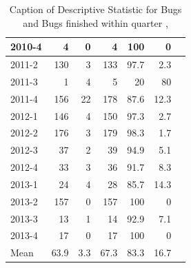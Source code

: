 \documentclass[UKenglish]{ifimaster}  %
\begin{document}
\begin{appendices}
\begin{table}[!htbp]
\begin{adjustwidth}{-2.5cm}{}
{{\begin{tabular}{ | l | r | r | r | r | r | r | }
2010-4 & 4 & 0 & 4 & 100 & 0 \\ \hline
2011-2 & 130 & 3 & 133 & 97.7 & 2.3 \\ \hline
2011-3 & 1 & 4 & 5 & 20 & 80 \\ \hline
2011-4 & 156 & 22 & 178 & 87.6 & 12.3 \\ \hline
2012-1 & 146 & 4 & 150 & 97.3 & 2.7 \\ \hline
2012-2 & 176 & 3 & 179 & 98.3& 1.7 \\ \hline
2012-3 & 37 & 2 & 39 & 94.9& 5.1\\ \hline
2012-4 & 33 & 3 & 36 & 91.7 & 8.3 \\ \hline
2013-1 & 24 & 4 & 28 & 85.7 & 14.3 \\ \hline
2013-2 & 157 & 0 & 157 & 100 & 0 \\ \hline
2013-3 & 13 & 1 & 14 & 92.9& 7.1 \\ \hline
2013-4 & 17 & 0 & 17 & 100 & 0 \\ \hline
Mean & 63.9&3.3&67.3&83.3&16.7\\ \hline

\end{tabular}
}
}
\end{adjustwidth}
\caption[Optional caption for list of figures]{Caption of Descriptive Statistic for Bugs and Bugs finished within quarter  , }
\label{DS:1:5} %
\end{table}
 
 
 

\end{appendices}
\end{document}
